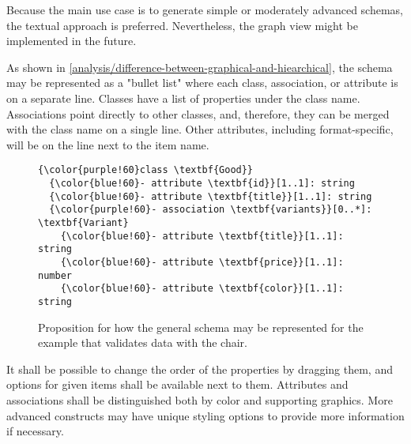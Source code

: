 Because the main use case is to generate simple or moderately advanced schemas, the textual approach is preferred. Nevertheless, the graph view might be implemented in the future.

\medskip

As shown in \autoref{analysis/difference-between-graphical-and-hiearchical}, the schema may be represented as a "bullet list" where each class, association, or attribute is on a separate line. Classes have a list of properties under the class name. Associations point directly to other classes, and, therefore, they can be merged with the class name on a single line. Other attributes, including format-specific, will be on the line next to the item name.

\begin{figure}[h!]\centering
  \begin{Verbatim}[commandchars=\\\{\}]
{\color{purple!60}class \textbf{Good}}
  {\color{blue!60}- attribute \textbf{id}}[1..1]: string
  {\color{blue!60}- attribute \textbf{title}}[1..1]: string
  {\color{purple!60}- association \textbf{variants}}[0..*]: \textbf{Variant}
    {\color{blue!60}- attribute \textbf{title}}[1..1]: string
    {\color{blue!60}- attribute \textbf{price}}[1..1]: number
    {\color{blue!60}- attribute \textbf{color}}[1..1]: string
\end{Verbatim}
  \caption{Proposition for how the general schema may be represented for the example that validates data with the chair.}
  \label{analysis/general-schema-representation}
\end{figure}

It shall be possible to change the order of the properties by dragging them, and options for given items shall be available next to them. Attributes and associations shall be distinguished both by color and supporting graphics. More advanced constructs may have unique styling options to provide more information if necessary.